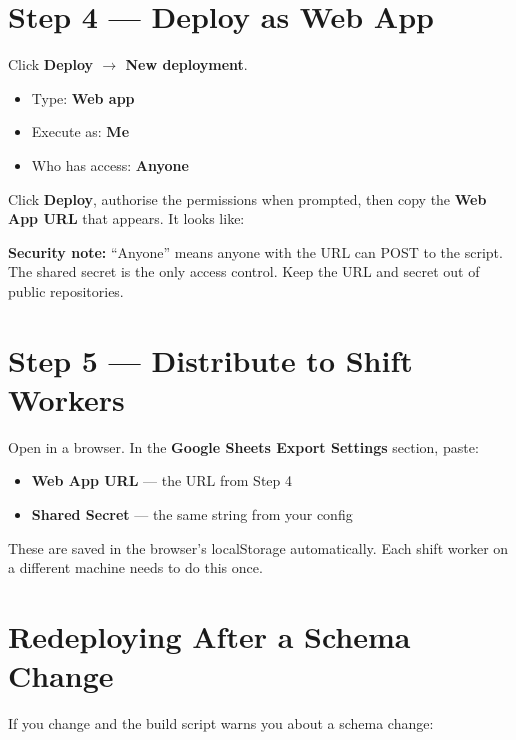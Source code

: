 \section{Step 4 --- Deploy as Web App}

Click \textbf{Deploy $\to$ New deployment}.

\begin{itemize}
    \item Type: \textbf{Web app}
    \item Execute as: \textbf{Me}
    \item Who has access: \textbf{Anyone}
\end{itemize}

Click \textbf{Deploy}, authorise the permissions when prompted, then copy the
\textbf{Web App URL} that appears. It looks like:\\

\begin{warningbox}
\textbf{Security note:} ``Anyone'' means anyone with the URL can POST to the
script. The shared secret is the only access control. Keep the URL and secret
out of public repositories.
\end{warningbox}

\section{Step 5 --- Distribute to Shift Workers}

Open  in a browser. In the
\textbf{Google Sheets Export Settings} section, paste:

\begin{itemize}
    \item \textbf{Web App URL} --- the URL from Step 4
    \item \textbf{Shared Secret} --- the same string from your config
\end{itemize}

These are saved in the browser's localStorage automatically. Each shift worker
on a different machine needs to do this once.

\section{Redeploying After a Schema Change}

If you change  and the build script warns you about a schema
change:


